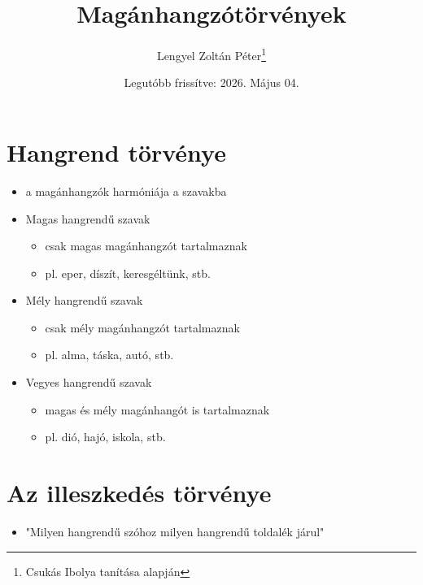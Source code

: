 \documentclass{article}
\title{Magánhangzótörvények}
\author{Lengyel Zoltán Péter\thanks{Csukás Ibolya tanítása alapján}}
\date{Legutóbb frissítve: 2026. Május 04.}
\begin{document}
\maketitle
\tableofcontents
\newpage

\section{Hangrend törvénye}
\begin{itemize}
    \item a magánhangzók harmóniája a szavakba
    \item Magas hangrendű szavak \begin{itemize}
        \item csak magas magánhangzót tartalmaznak 
        \item pl. eper, díszít, keresgéltünk, stb.
    \end{itemize}
    \item Mély hangrendű szavak \begin{itemize}
        \item csak mély magánhangzót tartalmaznak 
        \item pl. alma, táska, autó, stb.
    \end{itemize}
    \item Vegyes hangrendű szavak \begin{itemize}
        \item magas és mély magánhangót is tartalmaznak
        \item pl. dió, hajó, iskola, stb.
    \end{itemize}
\end{itemize}

\section{Az illeszkedés törvénye}
\begin{itemize}
    \item "Milyen hangrendű szóhoz milyen hangrendű toldalék járul"
\end{itemize}

\vspace{5pt}
\end{document}
